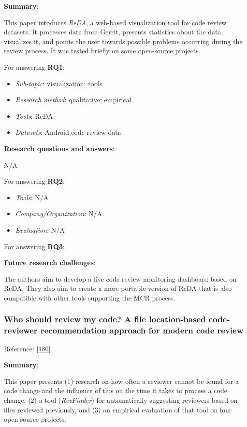\documentclass[]{book}
\providecommand{\tightlist}{%
  \setlength{\itemsep}{0pt}\setlength{\parskip}{0pt}}
\begin{document}
\textbf{Summary}:

This paper intoduces \emph{ReDA}, a web-based visualization tool for
code review datasets. It processes data from Gerrit, presents statistics
about the data, visualizes it, and points the user towards possible
problems occurring during the review process. It was tested briefly on
some open-source projects.

For answering \textbf{RQ1}:

\begin{itemize}
\tightlist
\item
  \emph{Sub-topic}: visualization; tools
\item
  \emph{Research method}: qualitative; empirical
\item
  \emph{Tools}: ReDA
\item
  \emph{Datasets}: Android code review data
\end{itemize}

\textbf{Research questions and answers}:

N/A

For answering \textbf{RQ2}:

\begin{itemize}
\tightlist
\item
  \emph{Tools}: N/A
\item
  \emph{Company/Organization}: N/A
\item
  \emph{Evaluation}: N/A
\end{itemize}

For answering \textbf{RQ3}:

\textbf{Future research challenges}:

The authors aim to develop a live code review monitoring dashboard based
on ReDA. They also aim to create a more portable version of ReDA that is
also compatible with other tools supporting the MCR process.

\subsubsection{Who should review my code? A file location-based
code-reviewer recommendation approach for modern code
review}\label{who-should-review-my-code-a-file-location-based-code-reviewer-recommendation-approach-for-modern-code-review}

Reference: {[}\protect\hyperlink{ref-thongtanunam2015should}{180}{]}

\textbf{Summary}:

This paper presents (1) research on how often a reviewer cannot be found
for a code change and the influence of this on the time it takes to
process a code change, (2) a tool (\emph{RevFinder}) for automatically
suggesting reviewers based on files reviewed previously, and (3) an
empirical evaluation of that tool on four open-source projects.
\end{document}
